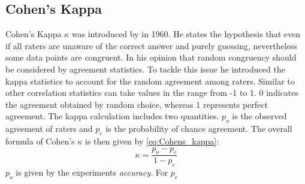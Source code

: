 \subsection{Cohen's Kappa}
\label{chp:fundamentals:sec:inter_rater_agreement:subsec:cohens_kappa}
Cohen's Kappa $\kappa$ was introduced by \textcite{Cohen:1960} in 1960.
He states the hypothesis that even if all raters are unaware of the correct answer and purely guessing, nevertheless some data points are congruent.
In his opinion that random congruency should be considered by agreement statistics.
To tackle this issue he introduced the kappa statistics to account for the random agreement among raters.
Similar to other correlation statistics can take values in the range from -1 to 1.
0 indicates the agreement obtained by random choice, whereas 1 represents perfect agreement.
The kappa calculation includes two quantities.
$p_o$ is the observed agreement of raters and $p_e$ is the probability of chance agreement.
The overall formula of Cohen's $\kappa$ is then given by \cref{eq:Cohens_kappa}:
\begin{equation}\label{eq:Cohens_kappa}
    \kappa = \frac{p_o - p_e}{1 - p_e}
\end{equation}
$p_o$ is given by the experiments \textit{accuracy}.
For $p_e$
